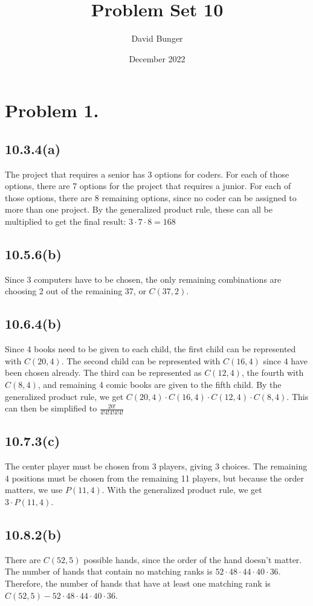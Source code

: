 \documentclass{article}
\title{Problem Set 10}
\author{David Bunger}
\date{December 2022}
\begin{document}
\maketitle

\section*{Problem 1.}
\subsection*{10.3.4(a)}
The project that requires a senior has 3 options for coders. For each of those options, there are 7 options for the project that requires a junior. For each of those options, there are 8 remaining options, since no coder can be assigned to more than one project.
By the generalized product rule, these can all be multiplied to get the final result: $3\cdot 7\cdot 8=168$
\subsection*{10.5.6(b)}
Since 3 computers have to be chosen, the only remaining combinations are choosing 2 out of the remaining 37, or $C(37,2)$.
\subsection*{10.6.4(b)}
Since 4 books need to be given to each child, the first child can be represented with $C(20,4)$. The second child can be represented with $C(16,4)$ since 4 have been chosen already. The third can be represented as $C(12,4)$, the fourth with $C(8,4)$, and remaining 4 comic books are given to the fifth child. By the generalized product rule, we get $C(20,4)\cdot C(16,4)\cdot C(12,4)\cdot C(8,4)$. This can then be simplified to $\frac{20!}{4!4!4!4!4!}$
\subsection*{10.7.3(c)}
The center player must be chosen from 3 players, giving 3 choices. The remaining 4 positions must be chosen from the remaining 11 players, but because the order matters, we use $P(11,4)$. With the generalized product rule, we get $3\cdot P(11,4)$.
\clearpage
\subsection*{10.8.2(b)}
There are $C(52,5)$ possible hands, since the order of the hand doesn't matter. The number of hands that contain no matching ranks is $52\cdot48\cdot44\cdot40\cdot36$. Therefore, the number of hands that have at least one matching rank is $C(52,5)- 52\cdot48\cdot44\cdot40\cdot36$.
\end{document}
